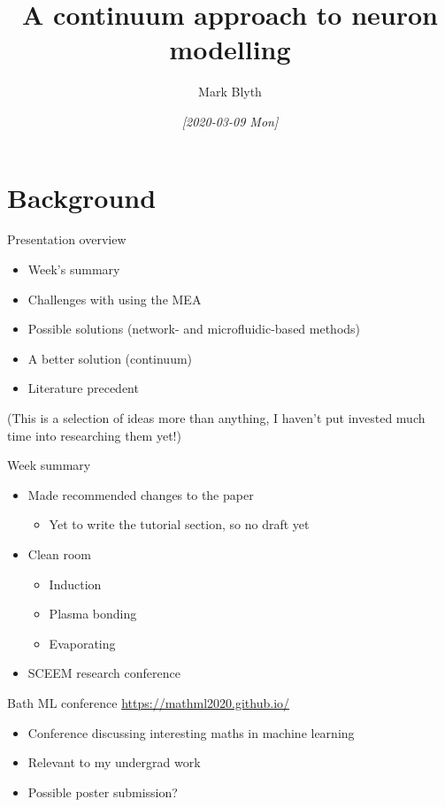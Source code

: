 \documentclass[presentation]{beamer}
\author{Mark Blyth}
\date{\textit{[2020-03-09 Mon]}}
\title{A continuum approach to neuron modelling}
\begin{document}
\maketitle

\section{Background}
\label{sec:orgec673a4}
\begin{frame}[label={sec:org2d04e5c}]{Presentation overview}
\begin{itemize}
\item Week's summary
\item Challenges with using the MEA
\item Possible solutions (network- and microfluidic-based methods)
\item A better solution (continuum)
\item Literature precedent
\end{itemize}

(This is a selection of ideas more than anything, I haven't put invested much time into researching them yet!)
\end{frame}

\begin{frame}[label={sec:org1bee182}]{Week summary}
\begin{itemize}
\item Made recommended changes to the paper
\begin{itemize}
\item Yet to write the tutorial section, so no draft yet
\end{itemize}
\item Clean room
\begin{itemize}
\item Induction
\item Plasma bonding
\item Evaporating
\end{itemize}
\item SCEEM research conference
\end{itemize}
\end{frame}

\begin{frame}[label={sec:org1f2b85b}]{Bath ML conference}
\url{https://mathml2020.github.io/}

\begin{itemize}
\item Conference discussing interesting maths in machine learning
\item Relevant to my undergrad work
\item Possible poster submission?
\end{itemize}
\end{frame}
\end{document}
